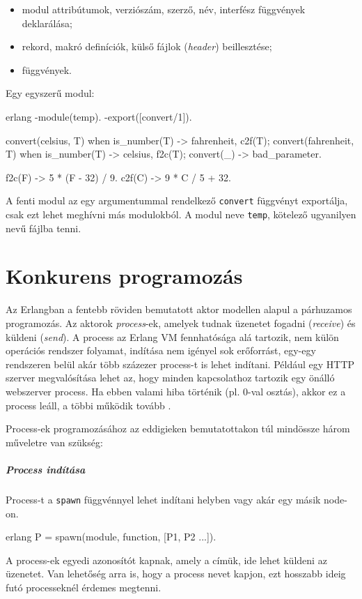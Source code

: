 \documentclass[12pt, a4paper, oneside]{book}
\begin{document}
\begin{itemize}
\item modul attribútumok, verziószám, szerző, név, interfész függvények
deklarálása;
\item rekord, makró definíciók, külső fájlok (\emph{header}) beillesztése;
\item függvények.
\end{itemize}

\noindent Egy egyszerű modul:

\begin{code}{erlang}{}
-module(temp).
-export([convert/1]).

convert({celsius, T}) when is_number(T) ->
  {fahrenheit, c2f(T)};
convert({fahrenheit, T}) when is_number(T) ->
  {celsius, f2c(T)};
convert(_) ->
  bad_parameter.

f2c(F) ->
  5 * (F - 32) / 9.
c2f(C) ->
  9 * C / 5 + 32.
\end{code}

A fenti modul az egy argumentummal rendelkező \texttt{convert} függvényt
exportálja, csak ezt lehet meghívni más modulokból. A modul neve \texttt{temp},
kötelező ugyanilyen nevű fájlba tenni.

\section{Konkurens programozás}
Az Erlangban a fentebb röviden bemutatott aktor modellen alapul a párhuzamos
programozás. Az aktorok \emph{process}-ek, amelyek tudnak üzenetet
fogadni (\emph{receive}) és küldeni (\emph{send}). A process az Erlang VM
fennhatósága alá tartozik, nem külön operációs rendszer folyamat, indítása nem
igényel sok erőforrást, egy-egy rendszeren belül akár több százezer process-t
is lehet indítani. Például egy HTTP szerver megvalósítása lehet az, hogy minden
kapcsolathoz tartozik egy önálló webszerver process. Ha ebben valami hiba
történik (pl. 0-val osztás), akkor ez a process leáll, a többi működik tovább
\citep{CesariniBook}.

Process-ek programozásához az eddigieken bemutatottakon túl mindössze három
műveletre van szükség:

\subparagraph{Process indítása} Process-t a \texttt{spawn} függvénnyel lehet
indítani helyben vagy akár egy másik node-on.
\begin{code}{erlang}{}
 P = spawn(module, function, [P1, P2 ...]).
\end{code}

\noindent A process-ek egyedi azonosítót kapnak, amely a címük, ide lehet
küldeni az üzenetet. Van lehetőség arra is, hogy a process nevet kapjon, ezt
hosszabb ideig futó processeknél érdemes megtenni.
\end{document}
